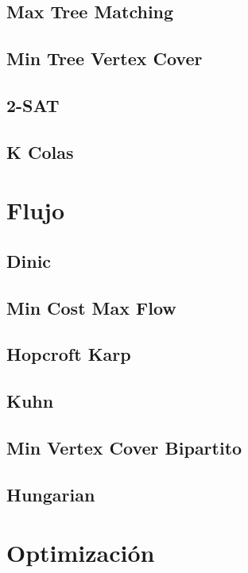 \documentclass[a4paper,11pt,landscape,twocolumn]{article}
\begin{document}
\subsection{Max Tree Matching}

\subsection{Min Tree Vertex Cover}

\subsection{2-SAT}

\subsection{K Colas}


\section{Flujo} %
\subsection{Dinic}

\subsection{Min Cost Max Flow}

\subsection{Hopcroft Karp}

\subsection{Kuhn}

\subsection{Min Vertex Cover Bipartito}

\subsection{Hungarian}


\section{Optimización} %
\end{document}
